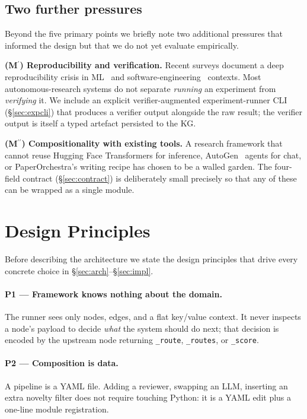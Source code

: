 \documentclass{article}
\newcommand{\code}[1]{\texttt{\small #1}}
\begin{document}
\subsection{Two further pressures}
\label{sec:m6}

Beyond the five primary points we briefly note two additional pressures
that informed the design but that we do not yet evaluate empirically.

\textbf{(M$^\prime$) Reproducibility and verification.} Recent surveys
document a deep reproducibility crisis in
ML~\cite{leakageml,paper2code} and software-engineering~\cite{seereprod}
contexts. Most autonomous-research systems do not separate
\emph{running} an experiment from \emph{verifying} it. We include an
explicit verifier-augmented experiment-runner CLI (\S\ref{sec:expcli})
that produces a verifier output alongside the raw result; the verifier
output is itself a typed artefact persisted to the KG.

\textbf{(M$^{\prime\prime}$) Compositionality with existing tools.} A
research framework that cannot reuse Hugging Face Transformers for
inference, AutoGen~\cite{autogen} agents for chat, or PaperOrchestra's
writing recipe has chosen to be a walled garden. The four-field contract
(\S\ref{sec:contract}) is deliberately small precisely so that any of
these can be wrapped as a single module.

\section{Design Principles}
\label{sec:design}

Before describing the architecture we state the design principles that
drive every concrete choice in \S\ref{sec:arch}--\S\ref{sec:impl}.

\paragraph{P1 --- Framework knows nothing about the domain.}
The runner sees only nodes, edges, and a flat key/value context. It never
inspects a node's payload to decide \emph{what} the system should do
next; that decision is encoded by the upstream node returning
\code{\_route}, \code{\_routes}, or \code{\_score}.

\paragraph{P2 --- Composition is data.}
A pipeline is a YAML file. Adding a reviewer, swapping an LLM, inserting
an extra novelty filter does not require touching Python: it is a YAML
edit plus a one-line module registration.
\end{document}
